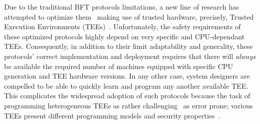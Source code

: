  Due to the traditional BFT protocols limitations, a new line of research has attempted to optimize them~\cite{10.1145/3492321.3519568, minBFT, hybster, 10.1145/2168836.2168866, DBLP:journals/corr/LiuLKA16a, trinc} making use of trusted hardware, precisely, Trusted Execution Environments (TEEs)~\cite{cryptoeprint:2016:086, arm-realm, amd-sev, riscv-multizone, intelTDX}.  Unfortunately, the safety requirements of these optimized protocols highly depend on very specific and CPU-dependant TEEs. Consequently, in addition to their limit adaptability and generality, these protocols' correct implementation and deployment requires that there will {\em always} be available the required number of machines equipped with specific CPU generation and TEE hardware versions. In any other case, system designers are compelled to be able to quickly learn and program any another available TEE. This complicates the widespread adoption of such protocols because the task of programming heterogeneous TEEs as rather challenging~\cite{10.1145/3460120.3485341} as error prone; various TEEs present different programming models and security properties~\cite{10.1007/978-3-031-16092-9_7}. %




